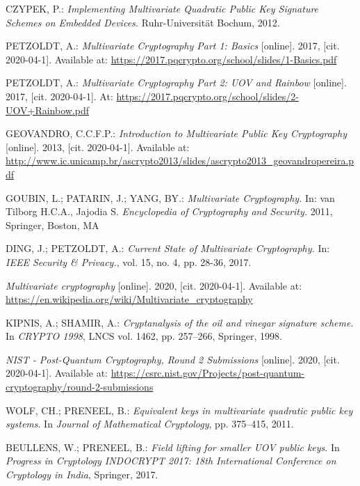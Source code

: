 \documentclass[thesis=M,english]{FITthesis}[2019/12/23]
\begin{document}
\begin{thebibliography}{9}
CZYPEK, P.: \textit{Implementing Multivariate Quadratic Public Key Signature Schemes on
Embedded Devices.}  Ruhr-Universit\"{a}t Bochum, 2012.

PETZOLDT, A.: \textit{Multivariate Cryptography Part 1: Basics} [online]. 2017, [cit. 2020-04-1]. Available at: \url{https://2017.pqcrypto.org/school/slides/1-Basics.pdf}

PETZOLDT, A.: \textit{Multivariate Cryptography Part 2: UOV and Rainbow} [online]. 2017, [cit. 2020-04-1]. At: \url{https://2017.pqcrypto.org/school/slides/2-UOV+Rainbow.pdf}

GEOVANDRO, C.C.F.P.: \textit{Introduction to Multivariate Public Key Cryptography} [online]. 2013, [cit. 2020-04-1]. Available at: \url{http://www.ic.unicamp.br/ascrypto2013/slides/ascrypto2013_geovandropereira.pdf}

GOUBIN, L.; PATARIN, J.; YANG, BY.: \textit{Multivariate Cryptography.} In: van Tilborg H.C.A., Jajodia S. \textit{Encyclopedia of Cryptography and Security.} 2011, Springer, Boston, MA

DING, J.; PETZOLDT, A.: \textit{Current State of Multivariate Cryptography.} In: \textit{IEEE Security \& Privacy.}, vol. 15, no. 4, pp. 28-36, 2017.

\textit{Multivariate cryptography} [online]. 2020, [cit. 2020-04-1]. Available at: \url{https://en.wikipedia.org/wiki/Multivariate_cryptography}

KIPNIS, A.; SHAMIR, A.: \textit{Cryptanalysis of the oil and vinegar signature scheme}. In \textit{CRYPTO 1998}, LNCS vol. 1462, pp. 257–266, Springer, 1998.

\textit{NIST - Post-Quantum Cryptography, Round 2 Submissions} [online]. 2020, [cit. 2020-04-1]. Available at: \url{https://csrc.nist.gov/Projects/post-quantum-cryptography/round-2-submissions}

WOLF, CH.; PRENEEL, B.: \textit{Equivalent keys in multivariate quadratic public key systems}. In \textit{Journal of Mathematical Cryptology}, pp. 375–415, 2011.

BEULLENS, W.; PRENEEL, B.: \textit{Field lifting for smaller UOV public keys}. In \textit{Progress
in Cryptology INDOCRYPT 2017: 18th International Conference on Cryptology in India}, Springer, 2017.


\end{thebibliography}
\end{document}
